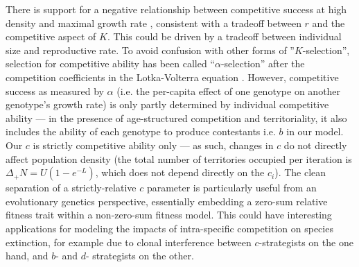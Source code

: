 \documentclass[11pt]{article}
\begin{document}


There is support for a negative relationship between competitive success at high density and maximal growth rate \citep{luckinbill_1979}, consistent with a tradeoff between $r$ and the competitive aspect of $K$. This could be driven by a tradeoff between individual size and reproductive rate. To avoid confusion with other forms of ''$K$-selection'', selection for competitive ability has been called ``$\alpha$-selection'' after the competition coefficients in the Lotka-Volterra equation \citep{gill_1974,case_1974,joshi_2001}. However, competitive success as measured by $\alpha$ (i.e. the per-capita effect of one genotype on another genotype's growth rate) is only partly determined by individual competitive ability --- in the presence of age-structured competition and territoriality, it also includes the ability of each genotype to produce contestants i.e. $b$ in our model. Our $c$ is strictly competitive ability only --- as such, changes in $c$ do not directly affect population density (the total number of territories occupied per iteration is $\Delta_+ N=U(1-e^{-L})$, which does not depend directly on the $c_i$). The clean separation of a strictly-relative $c$ parameter is particularly useful from an evolutionary genetics perspective, essentially embedding a zero-sum relative fitness trait within a non-zero-sum fitness model. This could have interesting applications for modeling the impacts of intra-specific competition on species extinction, for example due to clonal interference \citep{gerrish_1998,desai_2007} between $c$-strategists on the one hand, and $b$- and $d$- strategists on the other.
\end{document}

